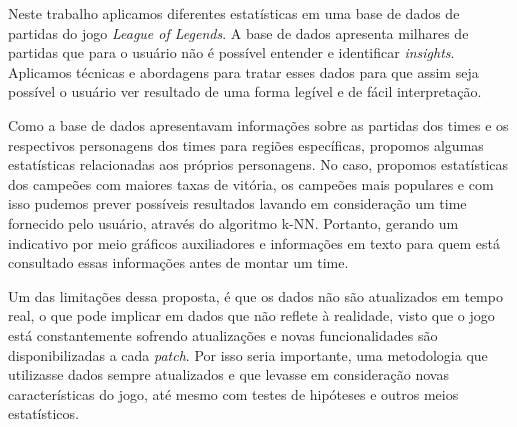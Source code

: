 \documentclass[a4paper]{article}
\begin{document}
Neste trabalho aplicamos diferentes estatísticas em uma base de dados de partidas do jogo \textit{League of Legends}. A base de dados apresenta milhares de partidas que para o usuário não é possível entender e identificar \textit{insights}. Aplicamos técnicas e abordagens para tratar esses dados para que assim seja possível o usuário ver resultado de uma forma legível e de fácil interpretação.

Como a base de dados apresentavam informações sobre as partidas dos times e os respectivos personagens dos times para regiões específicas, propomos algumas estatísticas relacionadas aos próprios personagens. No caso, propomos estatísticas dos campeões com maiores taxas de vitória, os campeões mais populares e com isso pudemos prever possíveis resultados lavando em consideração um time fornecido pelo usuário, através do algoritmo k-NN. Portanto, gerando um indicativo por meio gráficos auxiliadores e informações em texto para quem está consultado essas informações antes de montar um time.

Um das limitações dessa proposta, é que os dados não são atualizados em tempo real, o que pode implicar em dados que não reflete à realidade, visto que o jogo está constantemente sofrendo atualizações e novas funcionalidades são disponibilizadas a cada \textit{patch}. Por isso seria importante, uma metodologia que utilizasse dados sempre atualizados e que levasse em consideração novas características do jogo, até mesmo com testes de hipóteses e outros meios estatísticos.

\renewcommand{\refname}{Referências}


\end{document}
